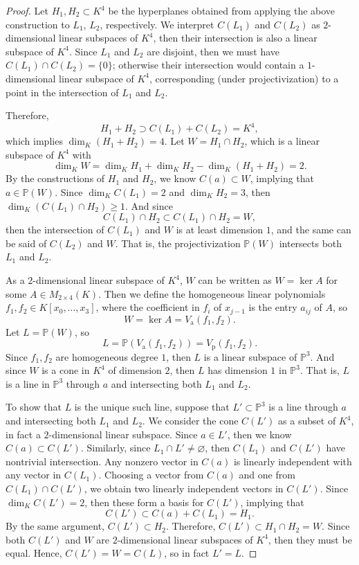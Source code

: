 \documentclass[12pt]{article}
\renewcommand{\emptyset}{\varnothing}
\newcommand{\<}{\langle}
\renewcommand{\>}{\rangle}
\renewcommand{\P}{\mathbb{P}}
\newcommand{\Vp}{V_{\mathrm{p}}}
\newcommand{\Va}{V_{\mathrm{a}}}
\newcommand{\Kx}[2]{K[x_{#1}, \dots, x_{#2}]}
\begin{document}
\begin{proof}
    Let $H_1, H_2 \subset K^4$ be the hyperplanes obtained from applying the above construction to $L_1$, $L_2$, respectively. We interpret $C(L_1)$ and $C(L_2)$ as $2$-dimensional linear subspaces of $K^4$, then their intersection is also a linear subspace of $K^4$. Since $L_1$ and $L_2$ are disjoint, then we must have $C(L_1) \cap C(L_2) = \{0\}$; otherwise their intersection would contain a $1$-dimensional linear subspace of $K^4$, corresponding (under projectivization) to a point in the intersection of $L_1$ and $L_2$.
    
    Therefore,
    \[
        H_1 + H_2 \supset C(L_1) + C(L_2) = K^4,
    \]
    which implies $\dim_K(H_1 + H_2) = 4$. Let $W = H_1 \cap H_2$, which is a linear subspace of $K^4$ with
    \[
        \dim_K W = \dim_K H_1 + \dim_K H_2 - \dim_K(H_1 + H_2) = 2.
    \]
    By the constructions of $H_1$ and $H_2$, we know $C(a) \subset W$, implying that $a \in \P(W)$. Since $\dim_K C(L_1) = 2$ and $\dim_K H_2 = 3$, then $\dim_K (C(L_1) \cap H_2) \geq 1$. And since
    \[
        C(L_1) \cap H_2 \subset C(L_1) \cap H_2 = W,
    \]
    then the intersection of $C(L_1)$ and $W$ is at least dimension $1$, and the same can be said of $C(L_2)$ and $W$. That is, the projectivization $\P(W)$ intersects both $L_1$ and $L_2$.
    
    As a $2$-dimensional linear subspace of $K^4$, $W$ can be written as $W = \ker A$ for some $A \in M_{2 \times 4}(K)$. Then we define the homogeneous linear polynomials $f_1, f_2 \in \Kx{0}{3}$, where the coefficient in $f_i$ of $x_{j-1}$ is the entry $a_{ij}$ of $A$, so
    \[
        W = \ker A = \Va(f_1, f_2).
    \]
    Let $L = \P(W)$, so
    \[
        L = \P(\Va(f_1, f_2)) = \Vp(f_1, f_2).
    \]
    Since $f_1, f_2$ are homogeneous degree $1$, then $L$ is a linear subspace of $\P^3$. And since $W$ is a cone in $K^4$ of dimension $2$, then $L$ has dimension $1$ in $\P^3$. That is, $L$ is a line in $\P^3$ through $a$ and intersecting both $L_1$ and $L_2$.

    To show that $L$ is the unique such line, suppose that $L' \subset \P^3$ is a line through $a$ and intersecting both $L_1$ and $L_2$. We consider the cone $C(L')$ as a subset of $K^4$, in fact a $2$-dimensional linear subspace. Since $a \in L'$, then we know $C(a) \subset C(L')$. Similarly, since $L_1 \cap L' \ne \emptyset$, then $C(L_1)$ and $C(L')$ have nontrivial intersection. Any nonzero vector in $C(a)$ is linearly independent with any vector in $C(L_1)$. Choosing a vector from $C(a)$ and one from $C(L_1) \cap C(L')$, we obtain two linearly independent vectors in $C(L')$. Since $\dim_K C(L') = 2$, then these form a basis for $C(L')$, implying that
    \[
        C(L') \subset C(a) + C(L_1) = H_1.
    \]
    By the same argument, $C(L') \subset H_2$. Therefore, $C(L') \subset H_1 \cap H_2 = W$. Since both $C(L')$ and $W$ are $2$-dimensional linear subspaces of $K^4$, then they must be equal. Hence, $C(L') = W = C(L)$, so in fact $L' = L$.
    

\end{proof}
\end{document}
